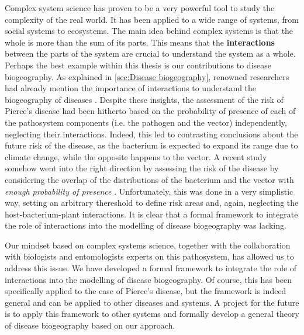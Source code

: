 Complex system science has proven to be a very powerful tool to study the
complexity of the real world. It has been applied to a wide range of systems,
from social systems to ecosystems. The main idea behind complex systems is that
the whole is more than the sum of its parts. This means that the
\textbf{interactions} between the parts of the system are crucial to understand
the system as a whole. Perhaps the best example within this thesis is our
contributions to disease biogeography. As explained in \cref{sec:Disease
    biogeography}, renowned researchers had already mention the importance of
interactions to understand the biogeography of diseases \cite{Peterson2008}.
Despite these insights, the assessment of the risk of Pierce's disease had been
hitherto based on the probability of presence of each of the pathosystem
components (i.e. the pathogen and the vector) independently, neglecting their
interactions. Indeed, this led to contrasting conclusions about the future risk
of the disease, as the bacterium is expected to expand its range due to climate
change, while the opposite happens to the vector. A recent study somehow went
into the right direction by assessing the risk of the disease by considering
the overlap of the distributions of the bacterium and the vector with
\textit{enough probability of presence} \cite{YoonLee2023}. Unfortunately, this
was done in a very simplistic way, setting an arbitrary thereshold to define
risk areas and, again, neglecting the host-bacterium-plant interactions. It is
clear that a formal framework to integrate the role of interactions into the
modelling of disease biogeography was lacking.

Our mindset based on complex systems science, together with the collaboration
with biologists and entomologists experts on this pathosystem, has allowed us
to address this issue. We have developed a formal framework to integrate the
role of interactions into the modelling of disease biogeography. Of course,
this has been specifically applied to the case of Pierce's disease, but the
framework is indeed general and can be applied to other diseases and systems.
A project for the future is to apply this framework to other systems and
formally develop a general theory of disease biogeography based on our
approach.

